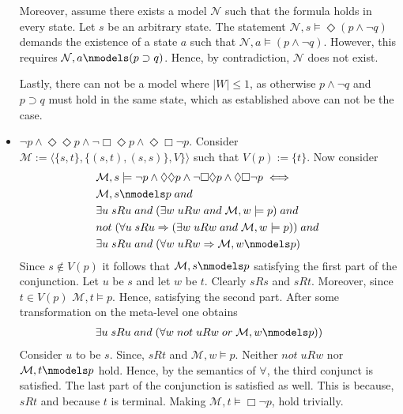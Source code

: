 \documentclass[11pt,a4paper]{article}
\newcommand{\lto}{\supset}
\newcommand{\some}{\Diamond}
\newcommand{\all}{\Box}
\newcommand{\sand}{\; and \;}
\newcommand{\sor}{ \; or \;}
\newcommand{\sneg}{not \;}
\newcommand{\sto}{\Rightarrow}
\begin{document}
\begin{itemize}
Moreover, assume there exists a model $\mathcal{N}$ such that the formula holds in every state. Let $s$ be an arbitrary state. The statement $\mathcal{N}, s \models \some (p \land \neg q)$ demands the existence of a state $a$ such that $\mathcal{N}, a \models (p \land \neg q)$. However, this requires  $\mathcal{N}, a \nmodels (p \lto q)$. Hence, by contradiction, $\mathcal{N}$ does not exist.


Lastly, there can not be a model where $|W|\leq 1$, as otherwise $p \land \neg q$ and $p \lto q$
must hold in the same state, which as established above can not be the case.

\item $\neg p \land \some \some p \land \neg \all \some p \land \some \all  \neg p$. Consider $\mathcal{M}:=\langle \{s,t\}, \{(s,t),(s,s)\}, V\}\rangle$ such that $V(p):=\{t\}$. Now consider
\begin{equation*}
\begin{split}
&\mathcal{M}, s \models \neg p \land \some \some p \land \neg \all \some p \land \some \all  \neg p \iff \\
&\mathcal{M}, s \nmodels p \sand \\
&\exists u \; sRu \sand (\exists w \; uRw \sand \mathcal{M}, w \models  p) \sand \\
&\sneg ( \forall u \; sRu \sto (\exists w \; uRw \sand \mathcal{M}, w \models p)) \sand  \\
&\exists u \; sRu \sand (\forall w \; uRw \sto \mathcal{M}, w \nmodels  p)
\end{split}
\end{equation*}
Since $s \notin V(p)$ it follows that $\mathcal{M}, s \nmodels p $ satisfying the first part of the conjunction. Let $u$ be $s$ and let $w$ be $t$. Clearly $sRs$ and $sRt$. Moreover, since $t \in V(p)$ $\mathcal{M},t\models p$. Hence, satisfying the second part. After some transformation on the meta-level one obtains 
\begin{equation*}
\begin{split}
\exists u \; sRu \sand (\forall w \; \sneg uRw \sor \mathcal{M}, w \nmodels p))
\end{split}
\end{equation*}
Consider $u$ to be $s$. Since, $sRt$ and $\mathcal{M}, w \models p$. Neither $\sneg uRw$ nor $\mathcal{M}, t \nmodels p$ hold. Hence, by the semantics of $\forall$, the third conjunct is satisfied. 
The last part of the conjunction is satisfied as well. This is because, $sRt$ and because $t$ is terminal. Making $\mathcal{M}, t \models \all \neg p$, hold trivially.


\end{itemize}
\end{document}
